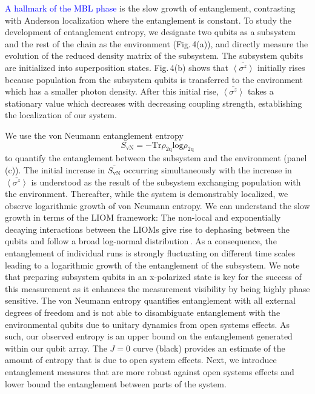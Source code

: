 \textcolor{blue}{A hallmark of the MBL phase} is the slow growth of entanglement, contrasting with Anderson localization where the entanglement is constant. To study the development of entanglement entropy, we designate two qubits as a subsystem and the rest of the chain as the environment (Fig.\,4(a)), and directly measure the evolution of the reduced density matrix of the subsystem. The subsystem qubits are initialized into superposition states. Fig.\,4(b) shows that $\overline{ \left< \sigma^z \right> }$ initially rises because population from the subsystem qubits is transferred to the environment which has a smaller photon density. After this initial rise, $\overline{ \left< \sigma^z \right> }$ takes a stationary value which decreases with decreasing coupling strength, establishing the localization of our system.

We use the von Neumann entanglement entropy
\begin{equation}
S_{\text{vN}}=-\text{Tr} \rho_{\text{2q}} \text{log} \rho_{\text{2q}}
\end{equation}
\noindent to quantify the entanglement between the subsystem and the environment (panel\,(c)).
The initial increase in $\overline{ S_{\text{vN}} }$ occurring simultaneously with the increase in $\overline{ \left< \sigma^z \right> }$ is understood as the result of the subsystem exchanging population with the environment.  Thereafter, while the system is demonstrably localized, we observe logarithmic growth of von Neumann entropy. We can understand the slow growth in terms of the LIOM framework: The non-local and exponentially decaying interactions between the LIOMs give rise to dephasing between the qubits and follow a broad log-normal distribution\,\cite{Varma2019}. As a consequence, the entanglement of individual runs is strongly fluctuating on different time scales leading to a logarithmic growth of the entanglement of the subsystem. We note that preparing subsystem qubits in an x-polarized state is key for the success of this measurement as it enhances the measurement visibility by being highly phase sensitive. The von Neumann entropy quantifies entanglement with all external degrees of freedom and is not able to disambiguate entanglement with the environmental qubits due to unitary dynamics from open systems effects.  As such, our observed entropy is an upper bound on the entanglement generated within our qubit array.  The $J=0$ curve (black) provides an estimate of the amount of entropy that is due to open system effects.  Next, we introduce entanglement measures that are more robust against open systems effects and lower bound the entanglement between parts of the system.

